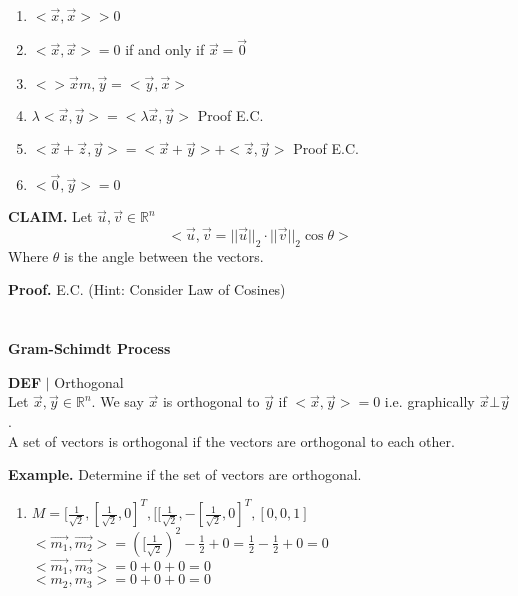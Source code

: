 \documentclass [12pt]{article}
\begin{document}
\begin{enumerate}
    \item $<\overrightarrow{x},\overrightarrow{x}> > 0$
    \item $<\overrightarrow{x},\overrightarrow{x}> = 0$ if and only if $\overrightarrow{x}=\overrightarrow{0}$
    \item $<>\overrightarrow{x}m,\overrightarrow{y} = <\overrightarrow{y},\overrightarrow{x}>$
    \item $\lambda<\overrightarrow{x},\overrightarrow{y}>=<\lambda\overrightarrow{x},\overrightarrow{y}>$ Proof E.C.
    \item $<\overrightarrow{x}+ \overrightarrow{z},\overrightarrow{y}>=<\overrightarrow{x}+\overrightarrow{y}>+<\overrightarrow{z},\overrightarrow{y}>$ Proof E.C.
    \item $<\overrightarrow{0},\overrightarrow{y}>=0$
\end{enumerate}
\begin{framed}
\textbf{CLAIM. }Let $\overrightarrow{u},\overrightarrow{v}\in\mathbb{R}^n$
\[<\overrightarrow{u},\overrightarrow{v} = ||\overrightarrow{u}||_2\cdot ||\overrightarrow{v}||_2\cos{\theta}>\]
Where $\theta$ is the angle between the vectors.
\end{framed}
\textbf{Proof.} E.C. (Hint: Consider Law of Cosines)\\
\\
\pagebreak
\\
\textbf{Gram-Schimdt Process}
\begin{framed}
\noindent\textbf{DEF} $|$ Orthogonal\\
Let $\overrightarrow{x},\overrightarrow{y}\in\mathbb{R}^n$. We say $\overrightarrow{x}$ is orthogonal to $\overrightarrow{y}$ if $<\overrightarrow{x},\overrightarrow{y}>=0$ i.e. graphically $\overrightarrow{x} \bot \overrightarrow{y}$. \\
A set of vectors is orthogonal if the vectors are orthogonal to each other.
\end{framed}
\noindent\textbf{Example. }Determine if the set of vectors are orthogonal.\\
\begin{enumerate}
    \item $M={[\frac{1}{\sqrt{2}},[\frac{1}{\sqrt{2}},0]^T,[[\frac{1}{\sqrt{2}},-[\frac{1}{\sqrt{2}},0]^T,[0,0,1]}$\\
    $<\overrightarrow{m_1},\overrightarrow{m_2}>=([\frac{1}{\sqrt{2}})^2-\frac{1}{2}+0=\frac{1}{2}-\frac{1}{2}+0=0$\\
    $<\overrightarrow{m_1},\overrightarrow{m_3}>=0+0+0=0$\\
    $<m_2,m_3>=0+0+0=0$
\end{enumerate}
\end{document}
